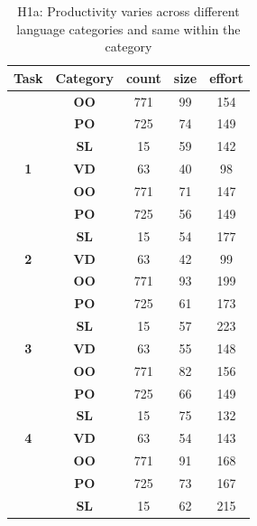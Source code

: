 \documentclass[sigconf,review]{acmart}
\begin{document}
\begin{table}
\scriptsize
\renewcommand{\baselinestretch}{0.5} 
\centering
\caption{H1a: Productivity varies across different language categories and same within the category
}
\label{tab:h1a}
\begin{tabular}{|c|c|c|c|c|}
\hline
\textbf{Task} & \textbf{Category} & \textbf{count} & \textbf{size} & \textbf{effort} \\ \hline
 & \textbf{OO} & 771 & 99 & 154 \\ \cline{2-5} 
 & \textbf{PO} & 725 & 74 & 149 \\ \cline{2-5} 
 & \textbf{SL} & 15 & \cellcolor[HTML]{C0C0C0}59 & 142 \\ \cline{2-5} 
\multirow{-4}{*}{\textbf{1}} & \textbf{VD} & 63 & \cellcolor[HTML]{C0C0C0}40 & \cellcolor[HTML]{C0C0C0}98 \\ \hline
 & \textbf{OO} & 771 & 71 & 147 \\ \cline{2-5} 
 & \textbf{PO} & 725 & 56 & 149 \\ \cline{2-5} 
 & \textbf{SL} & 15 & \cellcolor[HTML]{C0C0C0}54 & 177 \\ \cline{2-5} 
\multirow{-4}{*}{\textbf{2}} & \textbf{VD} & 63 & \cellcolor[HTML]{C0C0C0}42 & \cellcolor[HTML]{C0C0C0}99 \\ \hline
 & \textbf{OO} & 771 & 93 & 199 \\ \cline{2-5} 
 & \textbf{PO} & 725 & \cellcolor[HTML]{C0C0C0}61 & 173 \\ \cline{2-5} 
 & \textbf{SL} & 15 & \cellcolor[HTML]{C0C0C0}57 & 223 \\ \cline{2-5} 
\multirow{-4}{*}{\textbf{3}} & \textbf{VD} & 63 & \cellcolor[HTML]{C0C0C0}55 & \cellcolor[HTML]{C0C0C0}148 \\ \hline
 & \textbf{OO} & 771 & 82 & \cellcolor[HTML]{C0C0C0}156 \\ \cline{2-5} 
 & \textbf{PO} & 725 & \cellcolor[HTML]{C0C0C0}66 & \cellcolor[HTML]{C0C0C0}149 \\ \cline{2-5} 
 & \textbf{SL} & 15 & \cellcolor[HTML]{C0C0C0}75 & \cellcolor[HTML]{C0C0C0}132 \\ \cline{2-5} 
\multirow{-4}{*}{\textbf{4}} & \textbf{VD} & 63 & \cellcolor[HTML]{C0C0C0}54 & \cellcolor[HTML]{C0C0C0}143 \\ \hline
 & \textbf{OO} & 771 & 91 & \cellcolor[HTML]{C0C0C0}168 \\ \cline{2-5} 
 & \textbf{PO} & 725 & 73 & \cellcolor[HTML]{C0C0C0}167 \\ \cline{2-5} 
 & \textbf{SL} & 15 & \cellcolor[HTML]{C0C0C0}62 & \cellcolor[HTML]{C0C0C0}215 \\ \cline{2-5} 

\end{tabular}
\end{table}
\end{document}
